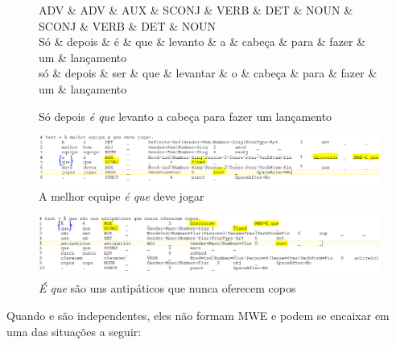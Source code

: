 \documentclass[output=paper,colorlinks,citecolor=brown]{langscibook}
\begin{document}
\begin{figure}[htbp]
			\centering
			\vspace{.8cm}
			\begin{dependency}
				\begin{deptext}
					ADV \& ADV \& AUX \& SCONJ \& VERB \& DET \& NOUN \& SCONJ \& VERB \& DET \& NOUN \\
					Só \& depois \& é \& que \& levanto \& a \& cabeça \& para \& fazer \& um \& lançamento \\
					só \& depois \& ser \& que \& levantar \& o \& cabeça \& para \& fazer \& um \& lançamento \\
				\end{deptext}
			\end{dependency}
			\caption{Só depois \emph{é que} levanto a cabeça para fazer um lançamento}
			\label{dep:equeMWE1}
		\end{figure}

		\begin{figure}
    	\centering
    	\includegraphics[width=\textwidth,height=\textheight,keepaspectratio]{imagesDrive/image16.png}
    	\caption{A melhor equipe \emph{é que} deve jogar}
    	\label{fig:equeMWE2}
    	\end{figure}{}

	\begin{figure}
    	\centering
    	\includegraphics[width=\textwidth,height=\textheight,keepaspectratio]{imagesDrive/image71.PNG}
    	\caption{\emph{É que} são uns antipáticos que nunca oferecem copos}
    	\label{fig:equeMWE3}
    	\end{figure}{}

	Quando  e  são independentes, eles não formam MWE e podem se encaixar em uma das situações a seguir:
\end{document}
